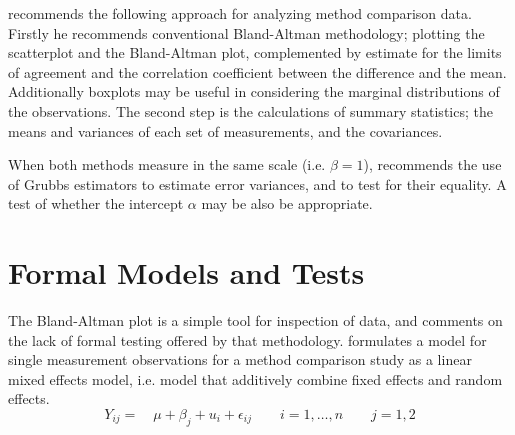 \documentclass[Main.tex]{subfiles}
\begin{document}
\citet{DunnSEME} recommends the following approach for analyzing
method comparison data. Firstly he recommends conventional
Bland-Altman methodology; plotting the scatterplot and the
Bland-Altman plot, complemented by estimate for the limits of
agreement and the correlation coefficient between the difference
and the mean. Additionally boxplots may be useful in considering
the marginal distributions of the observations. The second step is
the calculations of summary statistics; the means and variances of
each set of measurements, and the covariances.

When both methods measure in the same scale (i.e. $\beta = 1$),
\citet{DunnSEME} recommends the use of Grubbs estimators to
estimate error variances, and to test for their equality. A test
of whether the intercept $\alpha$ may be also be appropriate.








\newpage	

\section{Formal Models and Tests}
The Bland-Altman plot is a simple tool for inspection of data, and
\citet{Kinsella} comments on the lack of formal testing offered by
that methodology. \citet{Kinsella} formulates a model for
single measurement observations for a method comparison study as a
linear mixed effects model, i.e. model that additively combine
fixed effects and random effects.
\[
Y_{ij} =\quad \mu + \beta_{j} + u_{i} + \epsilon_{ij} \qquad i = 1,\dots,n
\qquad j=1,2\]
\end{document}
